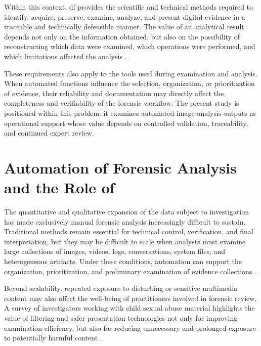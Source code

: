 Within this context, \gls{df} provides the scientific and technical methods
required to identify, acquire, preserve, examine, analyze, and present digital
evidence in a traceable and technically defensible manner. The value of an
analytical result depends not only on the information obtained, but also on the
possibility of reconstructing which data were examined, which operations were
performed, and which limitations affected the analysis
\cite{palmer2001road,reith2002examining,nist2006guide,iso27037}.

These requirements also apply to the tools used during examination and
analysis. When automated functions influence the selection, organization, or
prioritization of evidence, their reliability and documentation may directly
affect the completeness and verifiability of the forensic workflow. The present
study is positioned within this problem: it examines automated image-analysis
outputs as operational support whose value depends on controlled validation,
traceability, and continued expert review.

\section[Automation of Forensic Analysis and the Role of AI]
{Automation of Forensic Analysis and the Role of }

The quantitative and qualitative expansion of the data subject to investigation
has made exclusively manual forensic analysis increasingly difficult to
sustain. Traditional methods remain essential for technical control,
verification, and final interpretation, but they may be difficult to scale when
analysts must examine large collections of images, videos, logs, conversations,
system files, and heterogeneous artifacts. Under these conditions, automation
can support the organization, prioritization, and preliminary examination of
evidence collections
\cite{garfinkel2010digital,costantini2019digital}.

Beyond scalability, repeated exposure to disturbing or sensitive multimedia
content may also affect the well-being of practitioners involved in forensic
review. A survey of investigators working with child sexual abuse material
highlights the value of filtering and safer-presentation technologies not only
for improving examination efficiency, but also for reducing unnecessary and
prolonged exposure to potentially harmful content
\cite{sanchez2019practitioner}.

